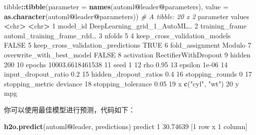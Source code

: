 \documentclass[
]{article}
\newenvironment{Shaded}{\begin{snugshade}}{\end{snugshade}}
\newcommand{\CommentTok}[1]{\textcolor[rgb]{0.56,0.35,0.01}{\textit{#1}}}
\newcommand{\DataTypeTok}[1]{\textcolor[rgb]{0.13,0.29,0.53}{#1}}
\newcommand{\DecValTok}[1]{\textcolor[rgb]{0.00,0.00,0.81}{#1}}
\newcommand{\ErrorTok}[1]{\textcolor[rgb]{0.64,0.00,0.00}{\textbf{#1}}}
\newcommand{\FloatTok}[1]{\textcolor[rgb]{0.00,0.00,0.81}{#1}}
\newcommand{\KeywordTok}[1]{\textcolor[rgb]{0.13,0.29,0.53}{\textbf{#1}}}
\newcommand{\NormalTok}[1]{#1}
\newcommand{\OperatorTok}[1]{\textcolor[rgb]{0.81,0.36,0.00}{\textbf{#1}}}
\newcommand{\OtherTok}[1]{\textcolor[rgb]{0.56,0.35,0.01}{#1}}
\newcommand{\StringTok}[1]{\textcolor[rgb]{0.31,0.60,0.02}{#1}}
\begin{document}
\begin{Shaded}
\begin{Highlighting}[]
\NormalTok{tibble}\OperatorTok{::}\KeywordTok{tibble}\NormalTok{(}\DataTypeTok{parameter =} \KeywordTok{names}\NormalTok{(automl}\OperatorTok{@}\NormalTok{leader}\OperatorTok{@}\NormalTok{parameters),}
\DataTypeTok{value =} \KeywordTok{as.character}\NormalTok{(automl}\OperatorTok{@}\NormalTok{leader}\OperatorTok{@}\NormalTok{parameters))}
\CommentTok{# A tibble: 20 x 2}
\NormalTok{ parameter values}
 \OperatorTok{<}\NormalTok{chr}\OperatorTok{>}\StringTok{ }\ErrorTok{<}\NormalTok{chr}\OperatorTok{>}
\StringTok{ }\DecValTok{1}\NormalTok{ model_id DeepLearning_grid_}\DecValTok{1}\NormalTok{_AutoML…}
 \DecValTok{2}\NormalTok{ training_frame automl_training_frame_rdd…}
 \DecValTok{3}\NormalTok{ nfolds }\DecValTok{5}
 \DecValTok{4}\NormalTok{ keep_cross_validation_models }\OtherTok{FALSE}
 \DecValTok{5}\NormalTok{ keep_cross_validation_predictions }\OtherTok{TRUE}
 \DecValTok{6}\NormalTok{ fold_assignment Modulo}
 \DecValTok{7}\NormalTok{ overwrite_with_best_model }\OtherTok{FALSE}
 \DecValTok{8}\NormalTok{ activation RectifierWithDropout}
 \DecValTok{9}\NormalTok{ hidden }\DecValTok{200}
\DecValTok{10}\NormalTok{ epochs }\FloatTok{10003.6618461538}
\DecValTok{11}\NormalTok{ seed }\DecValTok{1}
\DecValTok{12}\NormalTok{ rho }\FloatTok{0.95}
\DecValTok{13}\NormalTok{ epsilon }\FloatTok{1e-06}
\DecValTok{14}\NormalTok{ input_dropout_ratio }\FloatTok{0.2}
\DecValTok{15}\NormalTok{ hidden_dropout_ratios }\FloatTok{0.4}
\DecValTok{16}\NormalTok{ stopping_rounds }\DecValTok{0}
\DecValTok{17}\NormalTok{ stopping_metric deviance}
\DecValTok{18}\NormalTok{ stopping_tolerance }\FloatTok{0.05}
\DecValTok{19}\NormalTok{ x }\KeywordTok{c}\NormalTok{(}\StringTok{"cyl"}\NormalTok{, }\StringTok{"wt"}\NormalTok{)}
\DecValTok{20}\NormalTok{ y mpg}
\end{Highlighting}
\end{Shaded}

你可以使用最佳模型进行预测，代码如下：

\begin{Shaded}
\begin{Highlighting}[]
\KeywordTok{h2o.predict}\NormalTok{(automl}\OperatorTok{@}\NormalTok{leader, predictions)}
\NormalTok{ predict}
\DecValTok{1} \FloatTok{30.74639}
\NormalTok{[}\DecValTok{1}\NormalTok{ row x }\DecValTok{1}\NormalTok{ column]}
\end{Highlighting}
\end{Shaded}
\end{document}
